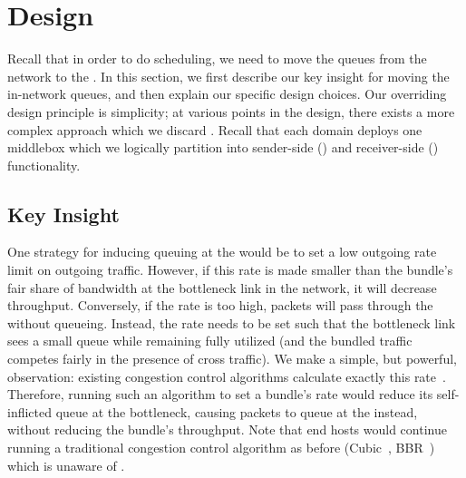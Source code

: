 \section{Design}\label{s:design}
%

Recall that in order to do scheduling, we need to move the queues from the network to the \name. 
In this section, we first describe our key insight for moving the in-network queues, and then explain our specific design choices. 
Our overriding design principle is simplicity; at various points in the design, there exists a more complex approach which we discard .
Recall that each domain deploys one \name middlebox which we logically partition into sender-side (\inbox) and receiver-side (\outbox) functionality.

\subsection{Key Insight}
One strategy for inducing queuing at the \inbox would be to set a low outgoing rate limit on outgoing traffic. 
However, if this rate is made smaller than the bundle's fair share of bandwidth at the bottleneck link in the network, it will decrease throughput. 
Conversely, if the rate is too high, packets will pass through the \inbox without queueing.
Instead, the rate needs to be set such that the bottleneck link sees a small queue while remaining fully utilized (and the bundled traffic competes fairly in the presence of cross traffic). 
We make a simple, but powerful, observation: existing congestion control algorithms calculate exactly this rate~\cite{Jacobson88}. 
Therefore, running such an algorithm to set a bundle's rate would reduce its self-inflicted queue at the bottleneck, causing packets to queue at the \inbox instead, without reducing the bundle's throughput.
Note that end hosts would continue running a traditional congestion control algorithm as before (\eg Cubic~\cite{cubic}, BBR~\cite{bbr}) which is unaware of \name.


